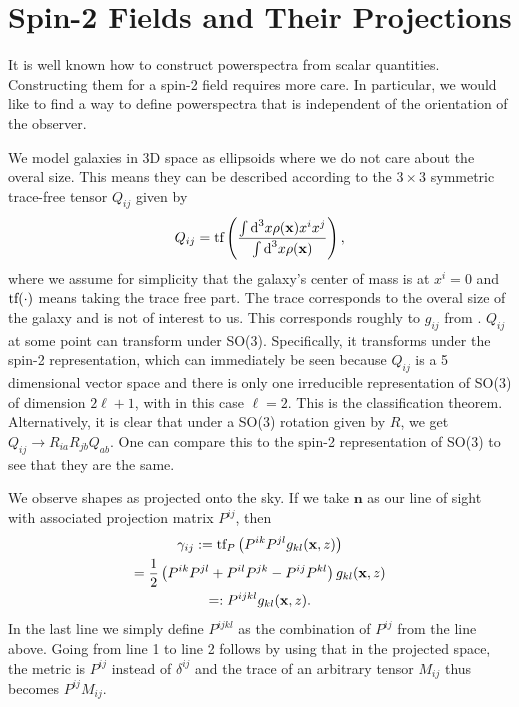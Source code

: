 \documentclass[11pt]{article}
\DeclareRobustCommand{\d}{\ifmmode\text{d}\else d\fi}
\DeclareRobustCommand{\tf}{\ifmmode\text{tf}\else d\fi}
\newcommand{\br}[1]{\ensuremath{\left( #1 \right)}}
\begin{document}
\section{Spin-2 Fields and Their Projections}
It is well known how to construct powerspectra from scalar quantities. Constructing them for a spin-2 field requires more care. In particular, we would like to find a way to define powerspectra that is independent of the orientation of the observer.

We model galaxies in 3D space as ellipsoids where we do not care about the overal size. This means they can be described according to the $3 \times 3$ symmetric trace-free tensor $Q_{ij}$ given by
\begin{equation}
    Q_{ij} = \tf\br{\frac{\int \d^3 x \rho(\mathbf x) x^i x^j}{\int\d^3 x \rho(\mathbf x)}},
\end{equation}
where we assume for simplicity that the galaxy's center of mass is at $x^i=0$ and $\tf (\cdot)$ means taking the trace free part. The trace corresponds to the overal size of the galaxy and is not of interest to us. This corresponds roughly to $g_{ij}$ from \cite{bakx2023effectivefieldtheoryintrinsic}.
$Q_{ij}$ at some point can transform under SO(3). Specifically, it transforms under the spin-2 representation, which can immediately be seen because $Q_{ij}$ is a 5 dimensional vector space and there is only one irreducible representation of SO(3) of dimension $2\ell + 1$, with in this case $\ell = 2$. This is the classification theorem. %
Alternatively, it is clear that under a SO(3) rotation given by $R$, we get $Q_{ij} \rightarrow R_{ia}R_{jb}Q_{ab}$. One can compare this to the spin-2 representation of SO(3) to see that they are the same. %

We observe shapes as projected onto the sky. If we take $\mathbf n$ as our line of sight with associated projection matrix $P^{ij}$, then
\begin{gather}
    \gamma_{ij} := \tf_P\br{P^{ik}P^{jl}g_{kl}(\mathbf x, z)}\\
                = \frac{1}{2}\br{P^{ik}P^{jl} + P^{il}P^{jk} - P^{ij}P^{kl}}g_{kl}(\mathbf x, z)\\
                =: P^{ijkl}g_{kl}(\mathbf x, z).
\end{gather}
In the last line we simply define $P^{ijkl}$ as the combination of $P^{ij}$ from the line above. Going from line 1 to line 2 follows by using that in the projected space, the metric is $P^{ij}$ instead of $\delta^{ij}$ and the trace of an arbitrary tensor $M_{ij}$ thus becomes $P^{ij}M_{ij}$. %
\end{document}
